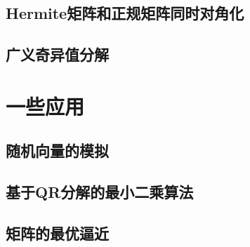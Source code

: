 \subsection{Hermite矩阵和正规矩阵同时对角化}
\label{sub:Hermite矩阵和正规矩阵同时对角化}

\subsection{广义奇异值分解}
\label{sub:广义奇异值分解}

\section{一些应用}
\label{sec:一些应用}

\subsection{随机向量的模拟}
\label{sub:随机向量的模拟}

\subsection{基于QR分解的最小二乘算法}
\label{sub:基于QR分解的最小二乘算法}

\subsection{矩阵的最优逼近}
\label{sub:矩阵的最优逼近}


